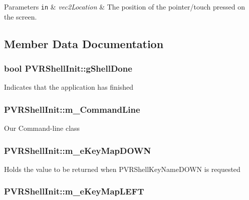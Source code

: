 
\begin{DoxyParams}[1]{Parameters}
\mbox{\tt in}  & {\em vec2\+Location} & The position of the pointer/touch pressed on the screen. \\
\hline
\end{DoxyParams}


\subsection{Member Data Documentation}
\hypertarget{class_p_v_r_shell_init_a62a5a14abcdc01fe0c73467631acef25}{
\subsubsection[{g\+Shell\+Done}]{\setlength{\rightskip}{0pt plus 5cm}bool P\+V\+R\+Shell\+Init\+::g\+Shell\+Done}}\label{class_p_v_r_shell_init_a62a5a14abcdc01fe0c73467631acef25}
Indicates that the application has finished \hypertarget{class_p_v_r_shell_init_a399bddf1f8ff7f9608102e8f7fb4e90d}{
\subsubsection[{m\+\_\+\+Command\+Line}]{ P\+V\+R\+Shell\+Init\+::m\+\_\+\+Command\+Line}}\label{class_p_v_r_shell_init_a399bddf1f8ff7f9608102e8f7fb4e90d}
Our Command-\/line class \hypertarget{class_p_v_r_shell_init_abd7862e314bbcd4c462c099c339bc524}{
\subsubsection[{m\+\_\+e\+Key\+Map\+D\+O\+W\+N}]{ P\+V\+R\+Shell\+Init\+::m\+\_\+e\+Key\+Map\+D\+O\+W\+N}}\label{class_p_v_r_shell_init_abd7862e314bbcd4c462c099c339bc524}
Holds the value to be returned when P\+V\+R\+Shell\+Key\+Name\+D\+O\+W\+N is requested \hypertarget{class_p_v_r_shell_init_a37c3b8166521548170e4e91684bd5cfa}{
\subsubsection[{m\+\_\+e\+Key\+Map\+L\+E\+F\+T}]{ P\+V\+R\+Shell\+Init\+::m\+\_\+e\+Key\+Map\+L\+E\+F\+T}}\label{class_p_v_r_shell_init_a37c3b8166521548170e4e91684bd5cfa}
